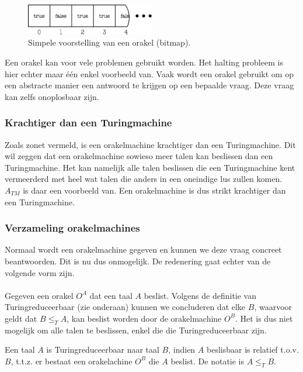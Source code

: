 \vspace{3mm}
\begin{figure}[h!]
  \centering
      \includegraphics[width=0.5\textwidth]{./img/oracle}
  \caption{Simpele voorstelling van een orakel (bitmap).}
\end{figure}
\vspace{3mm}

Een orakel kan voor vele problemen gebruikt worden. Het halting probleem is hier echter maar \'e\'en enkel voorbeeld van. Vaak wordt een orakel gebruikt om op een abstracte manier een antwoord te krijgen op een bepaalde vraag. Deze vraag kan zelfs onoplosbaar zijn.

\subsubsection*{Krachtiger dan een Turingmachine}

Zoals zonet vermeld, is een orakelmachine krachtiger dan een Turingmachine. Dit wil zeggen dat een orakelmachine sowieso meer talen kan beslissen dan een Turingmachine. Het kan namelijk alle talen beslissen die een Turingmachine kent vermeerderd met heel wat talen die anders in een oneindige lus zullen komen. $A_{TM}$ is daar een voorbeeld van. Een orakelmachine is dus strikt krachtiger dan een Turingmachine.

\subsubsection*{Verzameling orakelmachines}

Normaal wordt een orakelmachine gegeven en kunnen we deze vraag concreet beantwoorden. Dit is nu dus onmogelijk. De redenering gaat echter van de volgende vorm zijn.
\\\\
Gegeven een orakel $O^A$ dat een taal $A$ beslist. Volgens de definitie van Turingreduceerbaar (zie onderaan) kunnen we concluderen dat elke $B$, waarvoor geldt dat $B \leq_T A$, kan beslist worden door de orakelmachine $O^B$. Het is dus niet mogelijk om alle talen te beslissen, enkel die die Turingreduceerbaar zijn.

\begin{theorem}[Turingreduceerbaar]
	Een taal $A$ is Turingreduceerbaar naar taal $B$, indien $A$ beslisbaar is relatief t.o.v. $B$, t.t.z. er bestaat een orakelachine $O^B$ die $A$ beslist. De notatie is $A \leq_T B$.
\end{theorem}

